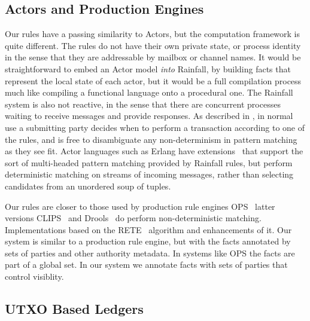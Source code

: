 \subsection{Actors and Production Engines}
Our rules have a passing similarity to Actors, but the computation framework is quite different. The rules do not have their own private state, or process identity in the sense that they are addressable by mailbox or channel names. It would be straightforward to embed an Actor model \emph{into} Rainfall, by building facts that represent the local state of each actor, but it would be a full compilation process much like compiling a functional language onto a procedural one. The Rainfall system is also not reactive, in the sense that there are concurrent processes waiting to receive messages and provide responses. As described in \REF, in normal use a submitting party decides when to perform a transaction according to one of the rules, and is free to disambiguate any non-determinism in pattern matching as they see fit. Actor languages such as Erlang have extensions~\cite{Sulzmann2008:MultiHeaded} that support the sort of multi-headed pattern matching provided by Rainfall rules, but perform deterministic matching on streams of incoming messages, rather than selecting candidates from an unordered soup of tuples. 

Our rules are closer to those used by production rule engines OPS~\cite{Forgy1981:OPS5} latter versions CLIPS~\cite{Riley2017:CLIPS} and Drools~\cite{Proctor2008:Drools} do perform non-deterministic matching. Implementations based on the RETE~\cite{Forgy1981:RETE} algorithm and enhancements \cite{Doorenbos1995:ProductionMatching} of it. Our system is similar to a production rule engine, but with the facts annotated by sets of parties and other authority metadata. In systems like OPS the facts are part of a global set. In our system we annotate facts with sets of parties that control visiblity.


\subsection{UTXO Based Ledgers}


